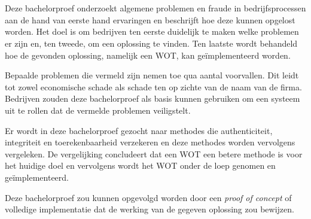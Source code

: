 

\chapter*{}

Deze bachelorproef onderzoekt algemene problemen en fraude in bedrijfsprocessen
aan de hand van eerste hand ervaringen en beschrijft hoe deze kunnen opgelost
worden. Het doel is om bedrijven ten eerste duidelijk te maken welke problemen
er zijn en, ten tweede, om een oplossing te vinden. Ten laatste wordt behandeld
hoe de gevonden oplossing, namelijk een \acrlong{WOT}, kan geïmplementeerd
worden.

Bepaalde problemen die vermeld zijn nemen toe qua aantal voorvallen. Dit leidt
tot zowel economische schade als schade ten op zichte van de naam van de
firma. Bedrijven zouden deze bachelorproef als basis kunnen gebruiken om een
systeem uit te rollen dat de vermelde problemen veiligstelt.

Er wordt in deze bachelorproef gezocht naar methodes die \gls{authenticiteit},
\gls{integriteit} en \gls{toerekenbaarheid} verzekeren en deze methodes worden
vervolgens vergeleken. De vergelijking concludeert dat een \acrlong{WOT} een
betere methode is voor het huidige doel en vervolgens wordt het \acrlong{WOT}
onder de loep genomen en geïmplementeerd.

Deze bachelorproef zou kunnen opgevolgd worden door een \textit{proof of
concept} of volledige implementatie dat de werking van de gegeven oplossing zou
bewijzen.
